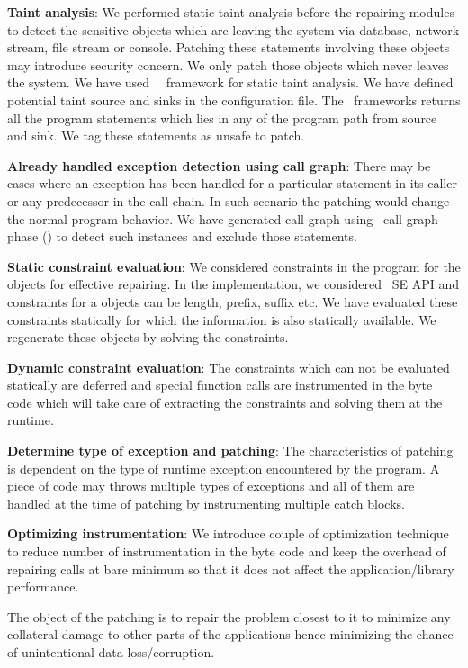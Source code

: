 \begin{mylist}
\item \textbf{Taint analysis}: We performed static taint analysis before the
repairing modules to detect the sensitive objects which are leaving the system
via database, network stream, file stream or console. Patching these statements
involving these objects may introduce security concern. We only patch those
objects which never leaves the system. We have used \soot\ \infoflow\ framework
for static taint analysis. We have defined potential taint source and sinks in the
configuration file. The \infoflow\ frameworks returns all the program
statements which lies in any of the program path from source and sink. We tag these
statements as unsafe to patch.

\item \textbf{Already handled exception detection using call graph}: There may
be cases where an exception has been handled for a particular statement in its
caller or any predecessor in the call chain. In such scenario the patching would
change the normal program behavior. We have generated call graph using \soot\
call-graph phase () to detect such instances and exclude those
statements.

\item \textbf{Static constraint evaluation}: We considered constraints in the
program for the objects for effective repairing. In the implementation, we
considered \java\ SE  API and constraints for a \code{String} objects
can be length, prefix, suffix etc. We have evaluated these constraints
statically for which the information is also statically available. We regenerate
these objects by solving the constraints.
	
\item \textbf{Dynamic constraint evaluation}: The constraints which can not be
evaluated statically are deferred and special function calls are instrumented in
the byte code which will take care of extracting the constraints and solving
them at the runtime.
	
\item \textbf{Determine type of exception and patching}: The characteristics of
patching is dependent on the type of runtime exception encountered by the
program. A piece of code may throws multiple types of exceptions and all of them
are handled at the time of patching by instrumenting multiple catch blocks.
	
\item \textbf{Optimizing instrumentation}: We introduce couple of optimization
technique to reduce number of instrumentation in the byte code and keep the
overhead of repairing calls at bare minimum so that it does not affect the
application/library performance.

\end{mylist}

The object of the patching is to repair the problem closest to it to minimize
any collateral damage to other parts of the applications hence minimizing the
chance of unintentional data loss/corruption.
